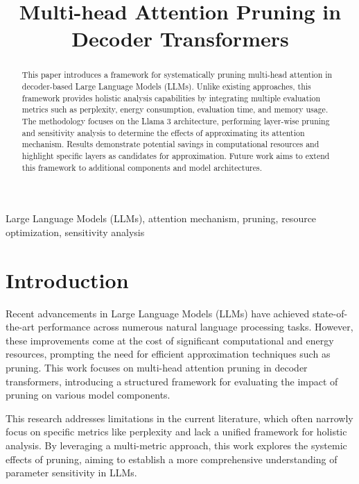 \documentclass[conference]{IEEEtran}
\begin{document}
    \title{Multi-head Attention Pruning in Decoder Transformers}

    \author{
    }

    \maketitle

    \begin{abstract}
        This paper introduces a framework for systematically pruning multi-head attention in decoder-based Large Language Models (LLMs). Unlike existing approaches, this framework provides holistic analysis capabilities by integrating multiple evaluation metrics such as perplexity, energy consumption, evaluation time, and memory usage. The methodology focuses on the Llama 3 architecture, performing layer-wise pruning and sensitivity analysis to determine the effects of approximating its attention mechanism. Results demonstrate potential savings in computational resources and highlight specific layers as candidates for approximation. Future work aims to extend this framework to additional components and model architectures.
    \end{abstract}

    \begin{IEEEkeywords}
        Large Language Models (LLMs), attention mechanism, pruning, resource optimization, sensitivity analysis
    \end{IEEEkeywords}

    \section{Introduction}
    Recent advancements in Large Language Models (LLMs) have achieved state-of-the-art performance across numerous natural language processing tasks. However, these improvements come at the cost of significant computational and energy resources, prompting the need for efficient approximation techniques such as pruning. This work focuses on multi-head attention pruning in decoder transformers, introducing a structured framework for evaluating the impact of pruning on various model components.

    This research addresses limitations in the current literature, which often narrowly focus on specific metrics like perplexity and lack a unified framework for holistic analysis. By leveraging a multi-metric approach, this work explores the systemic effects of pruning, aiming to establish a more comprehensive understanding of parameter sensitivity in LLMs.
\end{document}
